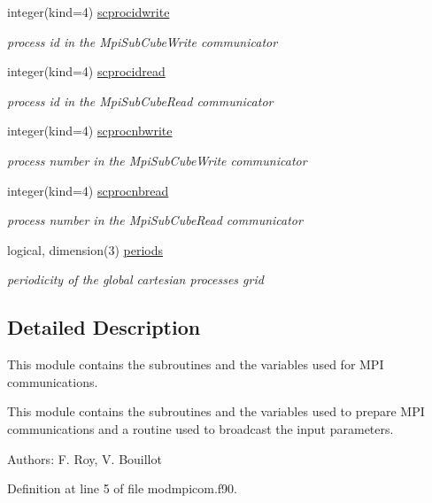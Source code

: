 \begin{DoxyCompactItemize}
integer(kind=4) \hyperlink{classmodmpicom_a0bade7a409f7af1432be0253a6262442}{scprocidwrite}
\begin{DoxyCompactList}\small\item\em process id in the Mpi\-Sub\-Cube\-Write communicator \end{DoxyCompactList}\item 
integer(kind=4) \hyperlink{classmodmpicom_a23d8fed28f6705c564d6a10038de36c7}{scprocidread}
\begin{DoxyCompactList}\small\item\em process id in the Mpi\-Sub\-Cube\-Read communicator \end{DoxyCompactList}\item 
integer(kind=4) \hyperlink{classmodmpicom_a8281c8567826b44d76d7a801203c99a8}{scprocnbwrite}
\begin{DoxyCompactList}\small\item\em process number in the Mpi\-Sub\-Cube\-Write communicator \end{DoxyCompactList}\item 
integer(kind=4) \hyperlink{classmodmpicom_a8fde31beaf4b43228d7f93325630cefa}{scprocnbread}
\begin{DoxyCompactList}\small\item\em process number in the Mpi\-Sub\-Cube\-Read communicator \end{DoxyCompactList}\item 
logical, dimension(3) \hyperlink{classmodmpicom_a57d5edb2a6734b602fe2d3d3c19cd1f9}{periods}
\begin{DoxyCompactList}\small\item\em periodicity of the global cartesian processes grid \end{DoxyCompactList}\end{DoxyCompactItemize}


\subsection{Detailed Description}
This module contains the subroutines and the variables used for M\-P\-I communications. 

This module contains the subroutines and the variables used to prepare M\-P\-I communications and a routine used to broadcast the input parameters.

Authors\-: F. Roy, V. Bouillot 

Definition at line 5 of file modmpicom.\-f90.



